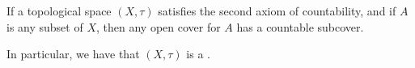 \documentclass[12pt]{article}
\begin{document}
If a topological space $(X,\tau)$ satisfies the second axiom of countability, and if $A$ is any subset of $X$, then any open cover for $A$ has a countable subcover. 

In particular, we have that $(X,\tau)$ is a .
\end{document}
